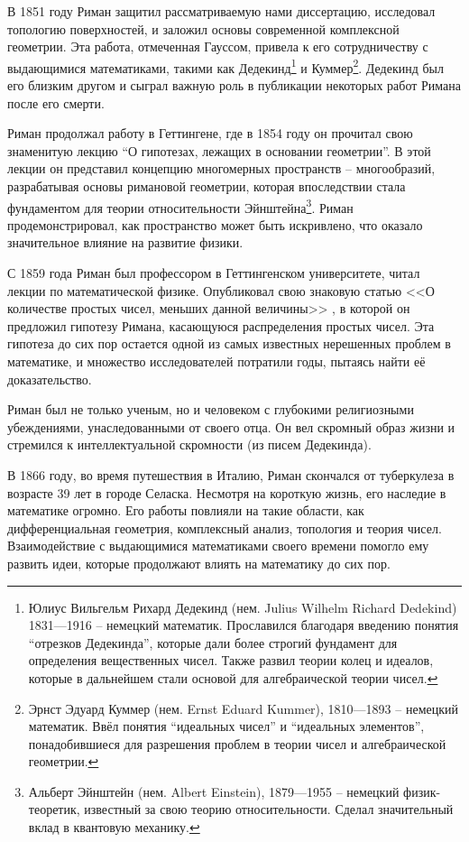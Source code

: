 \documentclass[a4paper,12pt]{article}
\theoremstyle{remark}
\begin{document}
В 1851 году Риман защитил рассматриваемую нами диссертацию,
исследовал топологию поверхностей, и заложил основы современной
комплексной геометрии. Эта работа, отмеченная Гауссом, привела
к его сотрудничеству с выдающимися математиками, такими как
Дедекинд\footnote{
  Юлиус Вильгельм Рихард Дедекинд (нем. Julius Wilhelm Richard Dedekind) 1831—1916 --
  немецкий математик. Прославился благодаря введению понятия ``отрезков Дедекинда'',
  которые дали более строгий фундамент для определения вещественных чисел.
  Также развил теории колец и идеалов, которые в дальнейшем стали основой для алгебраической теории чисел.
} и Куммер\footnote{
  Эрнст Эдуард Куммер (нем. Ernst Eduard Kummer), 1810—1893 --
  немецкий математик. Ввёл понятия ``идеальных чисел'' и ``идеальных элементов'', понадобившиеся для разрешения проблем в теории чисел и алгебраической геометрии.
}. Дедекинд был его близким другом и сыграл важную роль в публикации
некоторых работ Римана после его смерти.

Риман продолжал работу в Геттингене, где в 1854 году он
прочитал свою знаменитую лекцию ``О гипотезах, лежащих в основании геометрии''.
В этой лекции он представил концепцию многомерных пространств -- многообразий,
разрабатывая основы римановой геометрии, которая впоследствии стала
фундаментом для теории относительности Эйнштейна\footnote{
  Альберт Эйнштейн (нем. Albert Einstein), 1879—1955 --
  немецкий физик-теоретик, известный за свою теорию относительности.
  Сделал значительный вклад в квантовую механику.
}. Риман продемонстрировал, как пространство может быть искривлено, что
оказало значительное влияние на развитие физики.

С 1859 года Риман был профессором в Геттингенском университете, читал
лекции по математической физике. Опубликовал свою знаковую статью <<О количестве
простых чисел, меньших данной величины>> \cite{Hypothesis}, в которой он предложил
гипотезу Римана, касающуюся распределения простых чисел. Эта гипотеза
до сих пор остается одной из самых известных нерешенных проблем
в математике, и множество исследователей потратили годы, пытаясь
найти её доказательство.

Риман был не только ученым, но и человеком с глубокими религиозными
убеждениями, унаследованными от своего отца.
Он вел скромный образ жизни и стремился к интеллектуальной скромности (из писем Дедекинда).

В 1866 году, во время путешествия в Италию, Риман скончался от туберкулеза
в возрасте 39 лет в городе Селаска. Несмотря на короткую жизнь, его наследие в математике
огромно. Его работы повлияли на такие области, как дифференциальная геометрия,
комплексный анализ, топология и теория чисел. Взаимодействие с выдающимися
математиками своего времени помогло ему развить идеи, которые продолжают
влиять на математику до сих пор.
\end{document}
